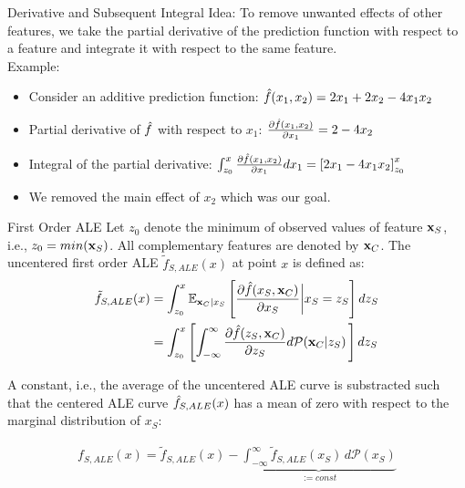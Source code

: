 \begin{vbframe}{Derivative and Subsequent Integral}
Idea: To remove unwanted effects of other features, we take the partial derivative of the prediction function with respect to a feature and integrate it with respect to the same feature. \\
\lz
Example:
\begin{itemize}
\item Consider an additive prediction function: $\fh(x_1, x_2) = 2x_1 + 2x_2 - 4x_1 x_2$
\lz
\item Partial derivative of $\fh$ with respect to $x_1$: $\frac{\partial \fh(x_1, x_2)}{\partial x_1} = 2 - 4x_2$
\lz
\item Integral of the partial derivative:  $\int_{z_0}^{x} \frac{\partial \fh(x_1, x_2)}{\partial x_1} dx_1 = \left[2x_1 - 4x_1 x_2\right]_{z_0}^{x}$
\lz
\item We removed the main effect of $x_2$ which was our goal.
\end{itemize}
\end{vbframe}


\begin{vbframe}{First Order ALE}
Let $z_0$ denote the minimum of observed values of feature $\xv_S$, i.e., $z_0 = min(\xv_S)$. All complementary features are denoted by $\xv_C$. The uncentered first order ALE $\tilde{f}_{S, ALE}(x)$ at point $x$ is defined as:
$$
\begin{aligned}
\tilde{f}_{S, ALE}(x) &= \int_{z_{0}}^{x} \mathbb{E}_{\xv_C \vert x_S} \left[\frac{\partial \fh(x_S, \xv_C)}{\partial x_S} \bigg \vert x_S = z_S \right] dz_S \\
&= \int_{z_{0}}^{x} \left[ \int_{-\infty}^{\infty}  \frac{\partial \fh(z_S, \xv_C)}{\partial z_S} d\mathcal{P}(\xv_C | z_S) \,   \right] dz_S
\end{aligned}
$$

A constant, i.e., the average of the uncentered ALE curve is substracted such that the centered ALE curve $\fh_{S, ALE}(x)$ has a mean of zero with respect to the marginal distribution of $x_S$:

$$
\begin{aligned}
f_{S, ALE}(x) = \tilde{f}_{S, ALE}(x) - \underbrace{\int_{-\infty}^{\infty}\tilde{f}_{S, ALE}(x_S) \, d\mathcal{P}(x_S)}_{:= const}
\end{aligned}
$$

\end{vbframe}

